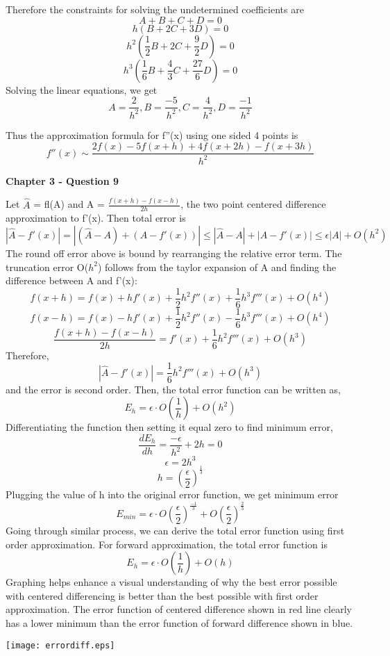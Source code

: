 \documentclass{article}
\begin{document}
Therefore the constraints for solving the undetermined coefficients are 
\[
A+B+C+D= 0
\]
\[
h(B+2C+3D)=0
\]
\[
h^{2}(\frac{1}{2}B+2C+\frac{9}{2}D)=0
\]
\[
h^{3}(\frac{1}{6}B+\frac{4}{3}C+\frac{27}{6}D)=0
\]
Solving the linear equations, we get 
\[
A = \frac{2}{h^{2}}, B= \frac{-5}{h^{2}}, C = \frac{4}{h^{2}}, D = \frac{-1}{h^{2}}
\]

Thus the approximation formula for f''(x) using one sided 4 points is 
\[
f''(x) \sim \frac{2f(x)-5 f(x+h) + 4f(x+2h) - f(x+3h)}{h^{2}}
\]


\textbf{Chapter 3 - Question 9}

Let $\hat A$ = fl(A) and A = $\frac{f(x+h)-f(x-h)}{2h}$, the two point centered difference approximation to f'(x). Then total error is
\[
\left | \hat A - f'(x)  \right | = \left |(\hat A - A) + (A- f'(x))  \right | \le \left | \hat A - A  \right | + \left | A - f'(x)  \right | \le \epsilon \left | A \right | + O(h^{2})
\] 
The round off error above is bound by rearranging the relative error term. The truncation error O($h^{2}$) follows from the taylor expansion of A and finding the difference between A and f'(x):
\[
f(x+h) = f(x) + hf'(x)+\frac{1}{2}h^{2}f''(x)+\frac{1}{6}h^{3}f'''(x)+O(h^{4})
\]
\[
f(x-h) = f(x) - hf'(x)+\frac{1}{2}h^{2}f''(x)-\frac{1}{6}h^{3}f'''(x)+O(h^{4})
\]
\[
\frac{f(x+h)-f(x-h)}{2h} = f'(x) + \frac{1}{6}h^{2}f'''(x)+O(h^{3})
\]
Therefore,
\[
\left | \hat A - f'(x)  \right | =  \frac{1}{6}h^{2}f'''(x)+O(h^{3})
\]
and the error is second order. Then, the total error function can be written as,
\[
E_{h} = \epsilon \cdot O(\frac{1}{h}) + O(h^{2})
\]
Differentiating the function then setting it equal zero to find minimum error, 
\[
\frac{dE_{h}}{dh}= \frac{-\epsilon}{h^{2}}+2h = 0
\]
\[
\epsilon = 2h^{3}
\]
\[
h= (\frac{\epsilon}{2})^{\frac{1}{3}}
\]
Plugging the value of h into the original error function, we get minimum error
\[
E_{min} = \epsilon \cdot O(\frac{\epsilon}{2})^\frac{-1}{3} + O(\frac{\epsilon}{2})^\frac{2}{3}
\]
Going through similar process, we can derive the total error function using first order approximation. For forward approximation, the total error function is 
\[
E_{h} = \epsilon \cdot O(\frac{1}{h}) + O(h)
\]
\newpage
Graphing helps enhance a visual understanding of why the best error possible with centered differencing is better than the best possible with first order approximation. The error function of centered difference shown in red line clearly has a lower minimum than the error function of forward difference shown in blue. 

\begin{center}
\texttt{[image: errordiff.eps]}
\end{center}
\end{document}
